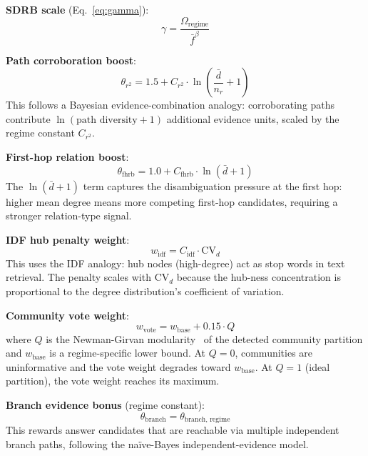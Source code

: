 \documentclass[11pt,a4paper]{article}
\begin{document}
\noindent\textbf{SDRB scale} (Eq.~\ref{eq:gamma}):
\begin{equation}
  \gamma = \frac{\Omega_{\text{regime}}}{\bar{f}^{\beta}}
\end{equation}

\noindent\textbf{Path corroboration boost}:
\begin{equation}
  \theta_{r^2} = 1.5 + C_{r^2} \cdot \ln\!\left(\frac{\bar{d}}{n_r} + 1\right)
  \label{eq:r2}
\end{equation}
This follows a Bayesian evidence-combination analogy: corroborating paths
contribute $\ln(\text{path diversity} + 1)$ additional evidence units, scaled
by the regime constant $C_{r^2}$.

\noindent\textbf{First-hop relation boost}:
\begin{equation}
  \theta_{\text{fhrb}} = 1.0 + C_{\text{fhrb}} \cdot \ln(\bar{d} + 1)
  \label{eq:fhrb}
\end{equation}
The $\ln(\bar{d}+1)$ term captures the disambiguation pressure at the first hop:
higher mean degree means more competing first-hop candidates, requiring a
stronger relation-type signal.

\noindent\textbf{IDF hub penalty weight}:
\begin{equation}
  w_{\text{idf}} = C_{\text{idf}} \cdot \text{CV}_d
  \label{eq:idf}
\end{equation}
This uses the IDF analogy: hub nodes (high-degree) act as stop words in
text retrieval. The penalty scales with $\text{CV}_d$ because the
hub-ness concentration is proportional to the degree distribution's
coefficient of variation.

\noindent\textbf{Community vote weight}:
\begin{equation}
  w_{\text{vote}} = w_{\text{base}} + 0.15 \cdot Q
  \label{eq:vote}
\end{equation}
where $Q$ is the Newman-Girvan modularity~\cite{newman2004finding}
of the detected community partition and $w_{\text{base}}$ is a
regime-specific lower bound.
At $Q = 0$, communities are uninformative and the vote weight degrades
toward $w_{\text{base}}$. At $Q = 1$ (ideal partition), the vote weight
reaches its maximum.

\noindent\textbf{Branch evidence bonus} (regime constant):
\begin{equation}
  \theta_{\text{branch}} = \theta_{\text{branch, regime}}
\end{equation}
This rewards answer candidates that are reachable via multiple independent
branch paths, following the na\"{i}ve-Bayes independent-evidence model.
\end{document}
